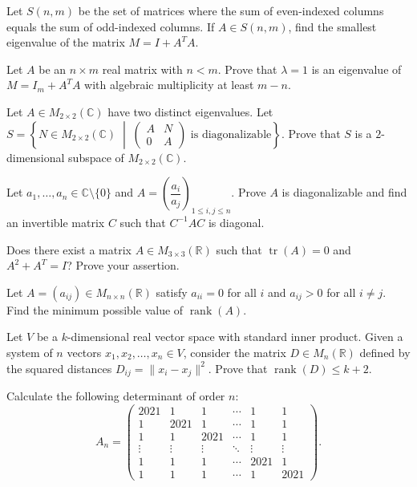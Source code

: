 \documentclass[12pt]{article}
\begin{document}
\begin{problems}
\item Let $S(n,m)$ be the set of matrices where the sum of even-indexed columns equals the sum of odd-indexed columns. If $A\in S(n,m)$, find the smallest eigenvalue of the matrix $M=I+A^TA$.

\item Let $A$ be an $n\times m$ real matrix with $n<m$. Prove that $\lambda=1$ is an eigenvalue of $M=I_m+A^TA$ with algebraic multiplicity at least $m-n$.

\item Let $A\in M_{2\times 2}(\mathbb{C})$ have two distinct eigenvalues. Let
 $S=\left\{N\in M_{2\times 2}(\mathbb{C}) \;\middle|\; \begin{pmatrix}A & N\\ 0 & A\end{pmatrix} \text{ is diagonalizable}\right\}$.
Prove that $S$ is a $2$-dimensional subspace of $M_{2\times 2}(\mathbb{C})$.

\item Let $a_1,\dots,a_n\in\mathbb{C}\setminus\{0\}$ and $A=\left(\dfrac{a_i}{a_j}\right)_{1\le i,j\le n}$. Prove $A$ is diagonalizable and find an invertible matrix $C$ such that $C^{-1}AC$ is diagonal.

\item Does there exist a matrix $A\in M_{3\times 3}(\mathbb{R})$ such that $\operatorname{tr}(A)=0$ and $A^2+A^T=I$? Prove your assertion.

\item Let $A=(a_{ij})\in M_{n\times n}(\mathbb{R})$ satisfy $a_{ii}=0$ for all $i$ and $a_{ij}>0$ for all $i\ne j$. Find the minimum possible value of $\operatorname{rank}(A)$.

\item Let $V$ be a $k$-dimensional real vector space with standard inner product. Given a system of $n$ vectors $x_1,x_2,\dots,x_n\in V$, consider the matrix $D\in M_n(\mathbb{R})$ defined by the squared distances $D_{ij}=\|x_i-x_j\|^2$. Prove that $\operatorname{rank}(D)\le k+2$.

\item Calculate the following determinant of order $n$:
\[
A_n=\begin{pmatrix}
2021 & 1 & 1 & \cdots & 1 & 1\\
1 & 2021 & 1 & \cdots & 1 & 1\\
1 & 1 & 2021 & \cdots & 1 & 1\\
\vdots & \vdots & \vdots & \ddots & \vdots & \vdots\\
1 & 1 & 1 & \cdots & 2021 & 1\\
1 & 1 & 1 & \cdots & 1 & 2021
\end{pmatrix}.
\]


\end{problems}
\end{document}

